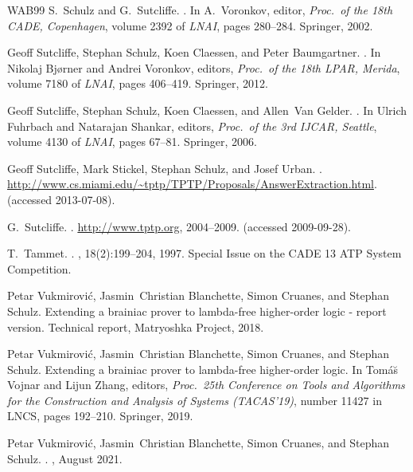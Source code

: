 \documentclass{report}
\begin{document}
\begin{thebibliography}{WAB{\etalchar{+}}99}
S.~Schulz and G.~Sutcliffe.
.
\newblock In A.~Voronkov, editor, {\em Proc.\ of the 18th CADE, Copenhagen},
  volume 2392 of {\em LNAI}, pages 280--284. Springer, 2002.

Geoff Sutcliffe, Stephan Schulz, Koen Claessen, and Peter Baumgartner.
.
\newblock In Nikolaj Bj{\o}rner and Andrei Voronkov, editors, {\em Proc.\ of
  the 18th LPAR, Merida}, volume 7180 of {\em LNAI}, pages 406--419. Springer,
  2012.

Geoff Sutcliffe, Stephan Schulz, Koen Claessen, and Allen~Van Gelder.
.
\newblock In Ulrich Fuhrbach and Natarajan Shankar, editors, {\em Proc.\ of the
  3rd IJCAR, Seattle}, volume 4130 of {\em LNAI}, pages 67--81. Springer, 2006.

Geoff Sutcliffe, Mark Stickel, Stephan Schulz, and Josef Urban.
.
\newblock
  \url{http://www.cs.miami.edu/~tptp/TPTP/Proposals/AnswerExtraction.html}.
\newblock (accessed 2013-07-08).

G.~Sutcliffe.
.
\newblock \url{http://www.tptp.org}, 2004--2009.
\newblock (accessed 2009-09-28).

T.~Tammet.
.
, 18(2):199--204, 1997.
\newblock Special Issue on the CADE 13 ATP System Competition.

Petar Vukmirovi{\'c}, Jasmin~Christian Blanchette, Simon Cruanes, and Stephan
  Schulz.
\newblock Extending a brainiac prover to lambda-free higher-order logic -
  report version.
\newblock Technical report, Matryoshka Project, 2018.

Petar Vukmirovi{\'c}, Jasmin~Christian Blanchette, Simon Cruanes, and Stephan
  Schulz.
\newblock Extending a brainiac prover to lambda-free higher-order logic.
\newblock In Tom{\'a}{\u s} Vojnar and Lijun Zhang, editors, {\em Proc.\ 25th
  Conference on Tools and Algorithms for the Construction and Analysis of
  Systems (TACAS'19)}, number 11427 in LNCS, pages 192--210. Springer, 2019.

Petar Vukmirovi{\'c}, Jasmin~Christian Blanchette, Simon Cruanes, and Stephan
  Schulz.
.
, August 2021.


\end{thebibliography}
\end{document}
